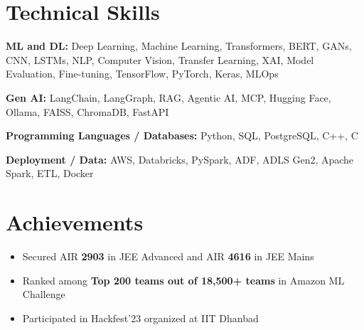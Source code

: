 \documentclass[a4paper,10pt]{article}
\begin{document}
\section{Technical Skills}

\small
\textbf{ML and DL:}
Deep Learning, Machine Learning, Transformers, BERT, GANs, CNN, LSTMs, NLP, Computer Vision, Transfer Learning, XAI, Model Evaluation, Fine-tuning, TensorFlow, PyTorch, Keras, MLOps

\vspace{2pt}

\textbf{Gen AI:}
LangChain, LangGraph, RAG, Agentic AI, MCP, Hugging Face, Ollama, FAISS, ChromaDB, FastAPI

\vspace{2pt}

\textbf{Programming Languages / Databases:}
Python, SQL, PostgreSQL, C++, C

\vspace{2pt}

\textbf{Deployment / Data:}
AWS, Databricks, PySpark, ADF, ADLS Gen2, Apache Spark, ETL, Docker

\section{Achievements}

\begin{itemize}[leftmargin=0.18in,itemsep=2pt]
\item Secured AIR \textbf{2903} in JEE Advanced and AIR \textbf{4616} in JEE Mains
\item Ranked among \textbf{Top 200 teams out of 18,500+ teams} in Amazon ML Challenge
\item Participated in Hackfest'23 organized at IIT Dhanbad
\end{itemize}
\end{document}
